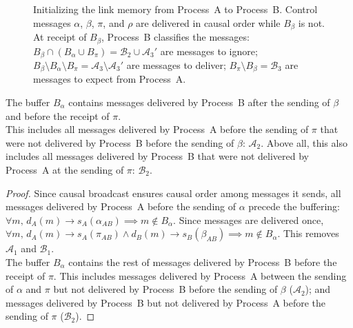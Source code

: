 \begin{figure*}
  \begin{center}
    
    \caption{\label{fig:timelineproof}\label{fig:timeline}Initializing the link
      memory from Process~A to Process~B. Control messages $\alpha$, $\beta$,
      $\pi$, and $\rho$ are delivered in causal order while $B_\beta$ is not. At
      receipt of $B_\beta$, Process~B classifies the messages:
      $B_\beta \cap (B_\alpha \cup B_\pi) = \mathcal{B}_2 \cup \mathcal{A}_3'$
      are messages to ignore;
      $B_\beta \setminus B_\alpha \setminus B_\pi = \mathcal{A}_3\setminus
      \mathcal{A}_3'$
      are messages to deliver; $B_\pi \setminus B_\beta = \mathcal{B}_3$ are
      messages to expect from Process~A.}
  \end{center}
\end{figure*}


  
\begin{lemma}
  The buffer $B_\alpha$ contains messages delivered by Process~B after the
  sending of $\beta$ and before the receipt of $\pi$.\\
  This includes all messages delivered by Process~A before the sending of $\pi$
  that were not delivered by Process~B before the sending of $\beta$:
  $\mathcal{A}_2$. Above all, this also includes all messages delivered
  by Process~B that were not delivered by Process~A at the sending of $\pi$:
  $\mathcal{B}_2$.
\end{lemma}

\begin{proof}
  Since causal broadcast ensures causal order among messages it sends, all
  messages delivered by Process~A before the sending of $\alpha$ precede the
  buffering:
  $\forall m,\, d_A(m) \rightarrow s_A(\alpha_{AB}) \implies m \not \in
  B_\alpha$.
  Since messages are delivered once,
  $\forall m,\, d_A(m) \rightarrow s_A(\pi_{AB}) \wedge d_B(m) \rightarrow
  s_B(\beta_{AB}) \implies m \not \in B_\alpha$.
  This removes $\mathcal{A}_1$ and $\mathcal{B}_1$.\\
  The buffer $B_\alpha$ contains the rest of messages delivered by Process~B
  before the receipt of $\pi$. This includes messages delivered by Process~A
  between the sending of $\alpha$ and $\pi$ but not delivered by Process~B
  before the sending of $\beta$ ($\mathcal{A}_2$); and messages delivered by
  Process~B but not delivered by Process~A before the sending of $\pi$
  ($\mathcal{B}_2$).
\end{proof}

